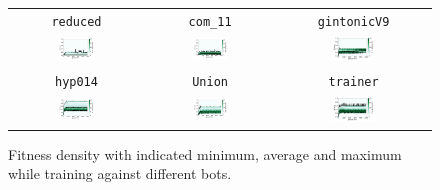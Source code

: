\documentclass[11pt,a4paper]{scrartcl}
\begin{document}
\begin{figure}[H]
\center
\begin{tabular}{ccc}
\texttt{reduced} & \texttt{com\_11} & \texttt{gintonicV9} \\
\includegraphics[width=0.3\textwidth]{img/standard_reduced.png} &
\includegraphics[width=0.3\textwidth]{img/standard_com_11.png} &
\includegraphics[width=0.3\textwidth]{img/standard_gintonicV9.png} \\
\texttt{hyp014} & \texttt{Union} & \texttt{trainer} \\
\includegraphics[width=0.3\textwidth]{img/standard_hyp014.png} &
\includegraphics[width=0.3\textwidth]{img/standard_Union.png} &
\includegraphics[width=0.3\textwidth]{img/standard_trainer.png}
\end{tabular}
\caption{Fitness density with indicated minimum, average and maximum while training against different bots.}
\label{fig:standard}
\end{figure}
\end{document}
